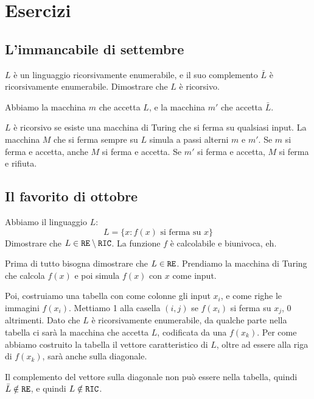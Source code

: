 \chapter{Esercizi}

\section{L'immancabile di settembre}

\begin{esercizio}
$L$ \`e un linguaggio ricorsivamente enumerabile, e il suo complemento $\bar{L}$ \`e ricorsivamente enumerabile. Dimostrare che $L$ \`e ricorsivo.
\end{esercizio}

Abbiamo la macchina $m$ che accetta $L$, e la macchina $m'$ che accetta $\bar{L}$.

$L$ \`e ricorsivo se esiste una macchina di Turing che si ferma su qualsiasi input. La macchina $M$ che si ferma sempre su $L$ simula a passi alterni $m$ e $m'$. Se $m$ si ferma e accetta, anche $M$ si ferma e accetta. Se $m'$ si ferma e accetta, $M$ si ferma e rifiuta.

\section{Il favorito di ottobre}

\begin{esercizio}
Abbiamo il linguaggio $L$:
\[
L = \{ x : f(x) \text{ si ferma su } x \}
\]
Dimostrare che $L \in \texttt{RE} \setminus \texttt{RIC}$. La funzione $f$ \`e calcolabile e biunivoca, eh.
\end{esercizio}

Prima di tutto bisogna dimostrare che $L \in \texttt{RE}$. Prendiamo la macchina di Turing che calcola $f(x)$ e poi simula $f(x)$ con $x$ come input.

Poi, costruiamo una tabella con come colonne gli input $x_i$, e come righe le immagini $f(x_i)$. Mettiamo 1 alla casella $(i,j)$ se $f(x_i)$ si ferma su $x_j$, 0 altrimenti. Dato che $L$ \`e ricorsivamente enumerabile, da qualche parte nella tabella ci sar\`a la macchina che accetta $L$, codificata da una $f(x_k)$. Per come abbiamo costruito la tabella il vettore caratteristico di $L$, oltre ad essere alla riga di $f(x_k)$, sar\`a anche sulla diagonale.

Il complemento del vettore sulla diagonale non pu\`o essere nella tabella, quindi $\bar{L} \notin \texttt{RE}$, e quindi $L \notin \texttt{RIC}$.


